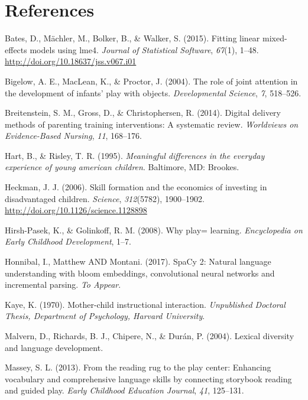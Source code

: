 \documentclass[10pt, letterpaper]{article}
\begin{document}
\section{References}\label{references}

\setlength{\parindent}{-0.1in} \setlength{\leftskip}{0.125in} \noindent

\hypertarget{refs}{}
\hypertarget{ref-lme4}{}
Bates, D., Mächler, M., Bolker, B., \& Walker, S. (2015). Fitting linear
mixed-effects models using lme4. \emph{Journal of Statistical Software},
\emph{67}(1), 1--48. \url{http://doi.org/10.18637/jss.v067.i01}

\hypertarget{ref-Bigelow2004}{}
Bigelow, A. E., MacLean, K., \& Proctor, J. (2004). The role of joint
attention in the development of infants' play with objects.
\emph{Developmental Science}, \emph{7}, 518--526.

\hypertarget{ref-Breitenstein2014}{}
Breitenstein, S. M., Gross, D., \& Christophersen, R. (2014). Digital
delivery methods of parenting training interventions: A systematic
review. \emph{Worldviews on Evidence-Based Nursing}, \emph{11},
168--176.

\hypertarget{ref-Hart1995}{}
Hart, B., \& Risley, T. R. (1995). \emph{Meaningful differences in the
everyday experience of young american children}. Baltimore, MD: Brookes.

\hypertarget{ref-Heckman2006}{}
Heckman, J. J. (2006). Skill formation and the economics of investing in
disadvantaged children. \emph{Science}, \emph{312}(5782), 1900--1902.
\url{http://doi.org/10.1126/science.1128898}

\hypertarget{ref-Hirsh2008}{}
Hirsh-Pasek, K., \& Golinkoff, R. M. (2008). Why play= learning.
\emph{Encyclopedia on Early Childhood Development}, 1--7.

\hypertarget{ref-spacy2}{}
Honnibal, I., Matthew AND Montani. (2017). SpaCy 2: Natural language
understanding with bloom embeddings, convolutional neural networks and
incremental parsing. \emph{To Appear}.

\hypertarget{ref-Kaye1970}{}
Kaye, K. (1970). Mother-child instructional interaction.
\emph{Unpublished Doctoral Thesis, Department of Psychology, Harvard
University}.

\hypertarget{ref-Malvern2004}{}
Malvern, D., Richards, B. J., Chipere, N., \& Durán, P. (2004). Lexical
diversity and language development.

\hypertarget{ref-Massey2013}{}
Massey, S. L. (2013). From the reading rug to the play center: Enhancing
vocabulary and comprehensive language skills by connecting storybook
reading and guided play. \emph{Early Childhood Education Journal},
\emph{41}, 125--131.
\end{document}
